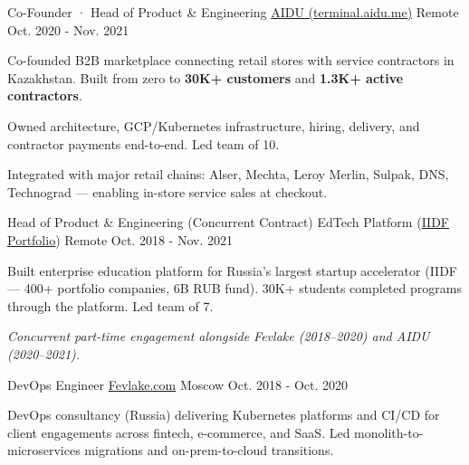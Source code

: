 \documentclass[10pt, a4paper]{awesome-cv}
\begin{document}
\begin{cventries}
  \cventry
    {Co-Founder · Head of Product \& Engineering}
    {\href{https://terminal.aidu.me/}{AIDU (terminal.aidu.me)}}
    {Remote}
    {Oct. 2020 - Nov. 2021}
    {
      \begin{cvitems}
        \item {Co-founded B2B marketplace connecting retail stores with service contractors in Kazakhstan. Built from zero to \textbf{30K+ customers} and \textbf{1.3K+ active contractors}.}
        \item {Owned architecture, GCP/Kubernetes infrastructure, hiring, delivery, and contractor payments end-to-end. Led team of 10.}
        \item {Integrated with major retail chains: Alser, Mechta, Leroy Merlin, Sulpak, DNS, Technograd --- enabling in-store service sales at checkout.}
      \end{cvitems}
    }

  \cventry
    {Head of Product \& Engineering (Concurrent Contract)}
    {EdTech Platform (\href{https://iidf.ru}{IIDF Portfolio})}
    {Remote}
    {Oct. 2018 - Nov. 2021}
    {
      \begin{cvitems}
        \item {Built enterprise education platform for Russia's largest startup accelerator (IIDF --- 400+ portfolio companies, 6B RUB fund). 30K+ students completed programs through the platform. Led team of 7.}
        \item {\textit{Concurrent part-time engagement alongside Fevlake (2018--2020) and AIDU (2020--2021).}}
      \end{cvitems}
    }

  \cventry
    {DevOps Engineer}
    {\href{https://fevlake.com}{Fevlake.com}}
    {Moscow}
    {Oct. 2018 - Oct. 2020}
    {
      \begin{cvitems}
        \item {DevOps consultancy (Russia) delivering Kubernetes platforms and CI/CD for client engagements across fintech, e-commerce, and SaaS. Led monolith-to-microservices migrations and on-prem-to-cloud transitions.}
      \end{cvitems}
    }

\end{cventries}

\end{document}
